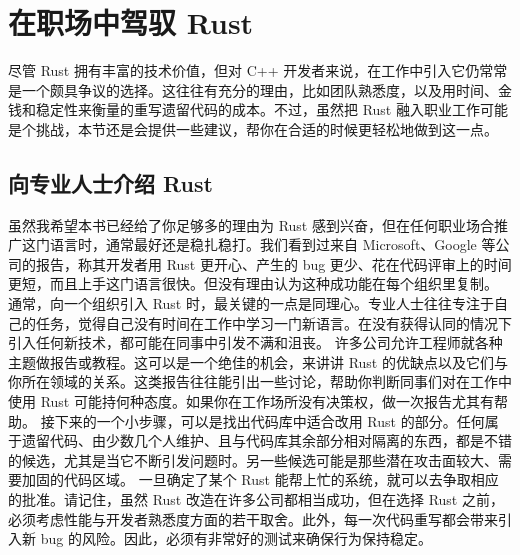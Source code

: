 \section{在职场中驾驭 Rust}
\label{idx:idx_664b8891}
尽管 Rust 拥有丰富的技术价值，但对 C++ 开发者来说，在工作中引入它仍常常是一个颇具争议的选择。这往往有充分的理由，比如团队熟悉度，以及用时间、金钱和稳定性来衡量的重写遗留代码的成本。不过，虽然把 Rust 融入职业工作可能是个挑战，本节还是会提供一些建议，帮你在合适的时候更轻松地做到这一点。
\subsection{向专业人士介绍 Rust}
\label{idx:idx_27e62525}
虽然我希望本书已经给了你足够多的理由为 Rust 感到兴奋，但在任何职业场合推广这门语言时，通常最好还是稳扎稳打。我们看到过来自 Microsoft、Google 等公司的报告，称其开发者用 Rust 更开心、产生的 bug 更少、花在代码评审上的时间更短，而且上手这门语言很快。但没有理由认为这种成功能在每个组织里复制。
通常，向一个组织引入 Rust 时，最关键的一点是同理心。专业人士往往专注于自己的任务，觉得自己没有时间在工作中学习一门新语言。在没有获得认同的情况下引入任何新技术，都可能在同事中引发不满和沮丧。
许多公司允许工程师就各种主题做报告或教程。这可以是一个绝佳的机会，来讲讲 Rust 的优缺点以及它们与你所在领域的关系。这类报告往往能引出一些讨论，帮助你判断同事们对在工作中使用 Rust 可能持何种态度。如果你在工作场所没有决策权，做一次报告尤其有帮助。
接下来的一个小步骤，可以是找出代码库中适合改用 Rust 的部分。任何属于遗留代码、由少数几个人维护、且与代码库其余部分相对隔离的东西，都是不错的候选，尤其是当它不断引发问题时。另一些候选可能是那些潜在攻击面较大、需要加固的代码区域。
\label{idx:idx_5b390b54}
一旦确定了某个 Rust 能帮上忙的系统，就可以去争取相应的批准。请记住，虽然 Rust 改造在许多公司都相当成功，但在选择 Rust 之前，必须考虑性能与开发者熟悉度方面的若干取舍。此外，每一次代码重写都会带来引入新 bug 的风险。因此，必须有非常好的测试来确保行为保持稳定。
